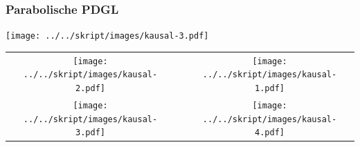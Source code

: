 \begin{frame}
\frametitle{Parabolische PDGL}
\begin{center}
\texttt{[image: ../../skript/images/kausal-3.pdf]}
\end{center}
\end{frame}

\begin{frame}
\begin{center}
\begin{tabular}{ccc}
\texttt{[image: ../../skript/images/kausal-2.pdf]}&&
\texttt{[image: ../../skript/images/kausal-1.pdf]}\\
\texttt{[image: ../../skript/images/kausal-3.pdf]}&&
\texttt{[image: ../../skript/images/kausal-4.pdf]}
\end{tabular}
\end{center}
\end{frame}
